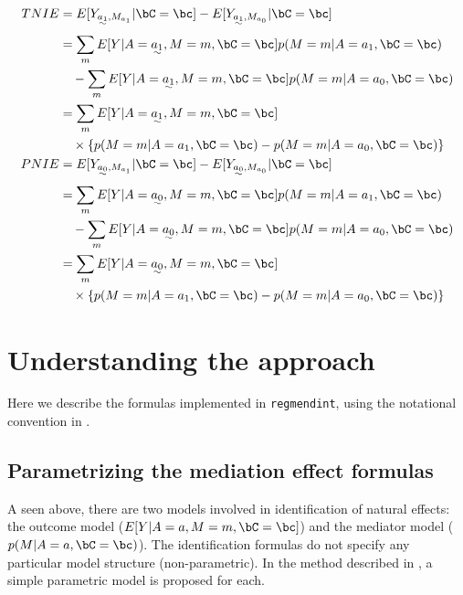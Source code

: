 \documentclass[dvipdfmx,10pt]{article}
\begin{document}
\begin{align*}
  TNIE
  &= E[Y_{\uwave{a_{1}},M_{a_{1}}} | \bC = \bc] - E[Y_{\uwave{a_{1}},M_{a_{0}}} | \bC = \bc]\\
  &=     \sum_{m} E[Y | A = \uwave{a_{1}}, M = m, \bC = \bc] p(M = m | A = a_{1}, \bC = \bc)\\
  &~~~ - \sum_{m} E[Y | A = \uwave{a_{1}}, M = m, \bC = \bc] p(M = m | A = a_{0}, \bC = \bc)\\
  &= \sum_{m} E[Y | A = \uwave{a_{1}}, M = m, \bC = \bc]\\
  &~~~ \times \left\{ p(M = m | A = a_{1}, \bC = \bc) - p(M = m | A = a_{0}, \bC = \bc) \right\}
  \\
  PNIE
   &= E[Y_{\uwave{a_{0}},M_{a_{1}}} | \bC = \bc] - E[Y_{\uwave{a_{0}},M_{a_{0}}} | \bC = \bc]\\
  &=     \sum_{m} E[Y | A = \uwave{a_{0}}, M = m, \bC = \bc] p(M = m | A = a_{1}, \bC = \bc)\\
  &~~~ - \sum_{m} E[Y | A = \uwave{a_{0}}, M = m, \bC = \bc] p(M = m | A = a_{0}, \bC = \bc)\\
  &= \sum_{m} E[Y | A = \uwave{a_{0}}, M = m, \bC = \bc]\\
  &~~~ \times \left\{ p(M = m | A = a_{1}, \bC = \bc) - p(M = m | A = a_{0}, \bC = \bc) \right\}
\end{align*}


\section{Understanding the approach}
\label{sec:orgd48a142}
Here we describe the formulas implemented in \texttt{regmendint}, using the notational convention in \cite{vanderweeleExplanationCausalInference2015,valeriMediationAnalysisAllowing2013,valeriSASMacroCausal2015}.

\subsection{Parametrizing the mediation effect formulas}
\label{sec:org9b91357}
A seen above, there are two models involved in identification of natural effects: the outcome model (\(E[Y|A=a,M=m,\bC=\bc]\)) and the mediator model (\(p(M|A=a,\bC=\bc)\)). The identification formulas do not specify any particular model structure (non-parametric). In the method described in \cite{valeriMediationAnalysisAllowing2013,valeriSASMacroCausal2015}, a simple parametric model is proposed for each.\\
\end{document}
